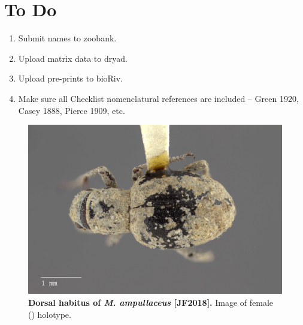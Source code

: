 \documentclass[fleqn,10pt,lineno]{wlpeerj} %
\begin{document}
\section*{To Do}
	\begin{enumerate}[itemsep=-0.4em]
		\item Submit names to zoobank.
		\item Upload matrix data to dryad.
		\item Upload pre-prints to bioR{\textchi}iv.
		\item Make sure all Checklist nomenclatural references are included -- Green 1920, Casey 1888, Pierce 1909, etc.
	\end{enumerate}

\newpage
 

\newpage

\begin{figure}[h]
	\begin{sideways}
		\centering
		\includegraphics[height=\textwidth]{ampullaceus_F_dorsal.jpg}
	\end{sideways}
	\caption{\textbf{Dorsal habitus of \textit{M. ampullaceus} [JF2018].} Image of female (\female) holotype.}
	\label{fig:ampullaceus_F_dorsal}
\end{figure}
\end{document}
